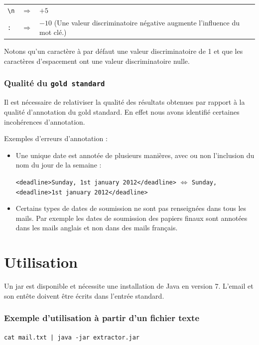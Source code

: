 \documentclass[a4paper,french,10pt]{article}
\begin{document}
\begin{tabular}{l c l}
\verb+\n+ & $\Rightarrow$ & $+5$ \\
\verb+:+ & $\Rightarrow$ & $-10$ (Une valeur discriminatoire négative augmente l'influence du mot clé.)\\
\end{tabular}

Notons qu'un caractère à par défaut une valeur discriminatoire de 1 et que les caractères d'espacement ont une valeur discriminatoire nulle.

\subsubsection{Qualité du \texttt{gold standard}}
Il est nécessaire de relativiser la qualité des résultats obtenues par rapport à la qualité d'annotation du gold standard. En effet nous avons identifié certaines incohérences d'annotation.

Exemples d'erreurs d'annotation :
\begin{itemize}
\item Une unique date est annotée de plusieurs manières, avec ou non l'inclusion du nom du jour de la semaine :

\texttt{<deadline>Sunday, 1st january 2012</deadline>} $\Leftrightarrow$ \texttt{Sunday, <deadline>1st january 2012</deadline>}

\item Certains types de dates de soumission ne sont pas renseignées dans tous les mails. Par exemple les dates de soumission des papiers finaux sont annotées dans les mails anglais et non dans des mails français.
\end{itemize}

\section{Utilisation}

Un jar est disponible et nécessite une installation de Java en version 7. L'email et son entête doivent être écrits dans l'entrée standard.

\subsubsection*{Exemple d'utilisation à partir d'un fichier texte}
\verb+cat mail.txt | java -jar extractor.jar+
\end{document}

